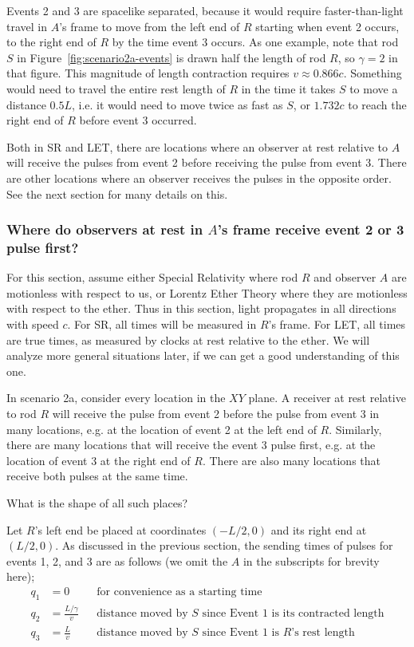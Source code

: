 \documentclass[a4paper]{article}
\theoremstyle{plain}
\theoremstyle{definition}
\begin{document}
Events 2 and 3 are spacelike separated, because it would require
faster-than-light travel in $A$'s frame to move from the left end of
$R$ starting when event 2 occurs, to the right end of $R$ by the time
event 3 occurs.  As one example, note that rod $S$ in
Figure~\ref{fig:scenario2a-events} is drawn half the length of rod $R$,
so $\gamma=2$ in that figure.  This magnitude of length contraction
requires $v \approx 0.866c$.  Something would need to travel the
entire rest length of $R$ in the time it takes $S$ to move a distance
$0.5L$, i.e. it would need to move twice as fast as $S$, or $1.732c$
to reach the right end of $R$ before event 3 occurred.

Both in SR and LET, there are locations where an observer at rest
relative to $A$ will receive the pulses from event 2 before receiving
the pulse from event 3.  There are other locations where an observer
receives the pulses in the opposite order.  See the next section for
many details on this.


\subsubsection{Where do observers at rest in $A$'s frame receive event 2 or 3 pulse first?}
\label{sec:scen2a-restpulsefirst}

For this section, assume either Special Relativity where rod $R$ and
observer $A$ are motionless with respect to us, or Lorentz Ether
Theory where they are motionless with respect to the ether.  Thus in
this section, light propagates in all directions with speed $c$.  For
SR, all times will be measured in $R$'s frame.  For LET, all times are
true times, as measured by clocks at rest relative to the ether.  We
will analyze more general situations later, if we can get a good
understanding of this one.

In scenario 2a, consider every location in the $XY$ plane.  A receiver
at rest relative to rod $R$ will receive the pulse from event 2 before
the pulse from event 3 in many locations, e.g. at the location of
event 2 at the left end of $R$.  Similarly, there are many locations
that will receive the event 3 pulse first, e.g. at the location of
event 3 at the right end of $R$.  There are also many locations that
receive both pulses at the same time.

What is the shape of all such places?

Let $R$'s left end be placed at coordinates $(-L/2,0)$ and its right
end at $(L/2,0)$.
As discussed in the previous section, the sending times of pulses for
events 1, 2, and 3 are as follows (we omit the $A$ in the subscripts
for brevity here);
\begin{align*}
q_1 & = 0 & & \text{for convenience as a starting time} \\
q_2 & = \frac{L/\gamma}{v} & & \text{distance moved by $S$ since Event 1 is its contracted length} \\
q_3 & = \frac{L}{v} & & \text{distance moved by $S$ since Event 1 is $R$'s rest length}
\end{align*}
\end{document}
